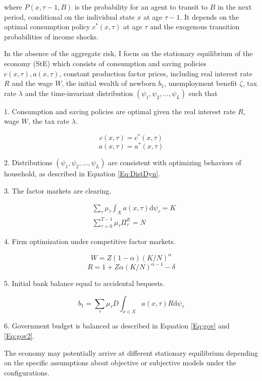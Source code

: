 where $P(x,\tau-1,B)$ is the probability for an agent to transit to $B$ in the next period, conditional on the individual state $x$ at age $\tau-1$. It depends on the optimal consumption policy $c^*(x,\tau)$ at age $\tau$ and the exogenous transition probabilities of income shocks. 

In the absence of the aggregate risk, I focus on the stationary equilibrium of the economy (StE) which consists of consumption and saving policies $c(x,\tau), a(x, \tau)$, constant production factor prices, including real interest rate $R$ and the wage $W$, the initial wealth of newborn $b_1$, unemployment benefit $\zeta$, tax rate $\lambda$ and the time-invariant distribution $\left(\psi_{1}, \psi_{2}, \ldots, \psi_{L}\right)$ such that

1. Consumption and saving policies are optimal given the real interest rate $R$, wage $W$, the tax rate $\lambda$.

$$c(x,\tau)= c^*(x,\tau)$$
$$a(x,\tau)= a^*(x,\tau)$$

2. Distributions $\left(\psi_{1}, \psi_{2}, \ldots, \psi_{L}\right)$ are consistent with optimizing behaviors of household, as described in Equation \ref{Eq:DistDyn}.

3. The factor markets are clearing. 

\begin{equation}
\begin{split}
   & \sum_{\tau} \mu_{\tau} \int_{X}a(x, \tau) \mathrm{d} \psi_{\tau}=K \\
& \sum^{T-1}_{\tau=0} \mu_{\tau} \Pi^E_\tau= N
\end{split}
\end{equation}

4. Firm optimization under competitive factor markets.

$$W = Z(1-\alpha) (K/N)^\alpha $$
$$R = 1+Z\alpha (K/N)^{\alpha-1} - \delta$$


5. Initial bank balance equal to accidental bequests. 

$$b_1=\sum_{\tau} \mu_{\tau}D \int_{x \in X} a(x, \tau)R \mathrm{d} \psi_{\tau}$$
 
6. Government budget is balanced as described in Equation \ref{Eq:gov} and \ref{Eq:gov2}. 

The economy may potentially arrive at different stationary equilibrium depending on the specific assumptions about objective or subjective models under the configurations. 



